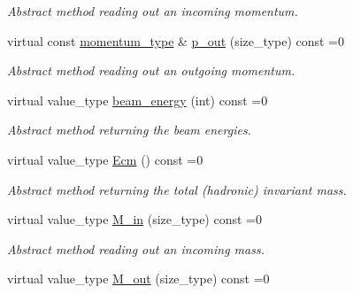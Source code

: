 \begin{DoxyCompactItemize}
\begin{DoxyCompactList}\small\item\em Abstract method reading out an incoming momentum. \end{DoxyCompactList}\item 
\hypertarget{a00451_aecdc8567f2e5cd0f2e7a7660f2a06722}{}virtual const \hyperlink{a00579}{momentum\+\_\+type} \& \hyperlink{a00451_aecdc8567f2e5cd0f2e7a7660f2a06722}{p\+\_\+out} (size\+\_\+type) const =0\label{a00451_aecdc8567f2e5cd0f2e7a7660f2a06722}

\begin{DoxyCompactList}\small\item\em Abstract method reading out an outgoing momentum. \end{DoxyCompactList}\item 
\hypertarget{a00451_aa5b9b0753a4f607517c5fcf26d82c921}{}virtual value\+\_\+type \hyperlink{a00451_aa5b9b0753a4f607517c5fcf26d82c921}{beam\+\_\+energy} (int) const =0\label{a00451_aa5b9b0753a4f607517c5fcf26d82c921}

\begin{DoxyCompactList}\small\item\em Abstract method returning the beam energies. \end{DoxyCompactList}\item 
\hypertarget{a00451_ac7c94ec848706882d18ee5983ee6c205}{}virtual value\+\_\+type \hyperlink{a00451_ac7c94ec848706882d18ee5983ee6c205}{Ecm} () const =0\label{a00451_ac7c94ec848706882d18ee5983ee6c205}

\begin{DoxyCompactList}\small\item\em Abstract method returning the total (hadronic) invariant mass. \end{DoxyCompactList}\item 
\hypertarget{a00451_a303558afdb7b6b704399fa5dd8bc9f30}{}virtual value\+\_\+type \hyperlink{a00451_a303558afdb7b6b704399fa5dd8bc9f30}{M\+\_\+in} (size\+\_\+type) const =0\label{a00451_a303558afdb7b6b704399fa5dd8bc9f30}

\begin{DoxyCompactList}\small\item\em Abstract method reading out an incoming mass. \end{DoxyCompactList}\item 
\hypertarget{a00451_a9f39b8a4fceb86b5cb3e669c77ccf62d}{}virtual value\+\_\+type \hyperlink{a00451_a9f39b8a4fceb86b5cb3e669c77ccf62d}{M\+\_\+out} (size\+\_\+type) const =0\label{a00451_a9f39b8a4fceb86b5cb3e669c77ccf62d}


\end{DoxyCompactItemize}
